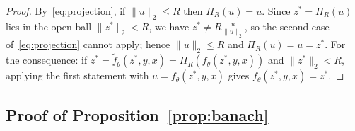 \documentclass{article}
\theoremstyle{plain}
\theoremstyle{definition}
\theoremstyle{remark}
\newcommand{\longonly}[1]{}
\newcommand{\longonly}[1]{#1}
\newcommand{\E}{\mathbb{E}}
\begin{document}
\begin{proof}
By~\eqref{eq:projection}, if $\|u\|_2 \le R$ then $\Pi_R(u)=u$.
Since $z^*=\Pi_R(u)$ lies in the open ball $\|z^*\|_2<R$, we have $z^*\ne R\tfrac{u}{\|u\|_2}$, so the second case of~\eqref{eq:projection} cannot apply; hence $\|u\|_2\le R$ and $\Pi_R(u)=u=z^*$.
For the consequence: if $z^*=\tilde f_\theta(z^*,y,x)=\Pi_R(f_\theta(z^*,y,x))$ and $\|z^*\|_2<R$, applying the first statement with $u=f_\theta(z^*,y,x)$ gives $f_\theta(z^*,y,x)=z^*$.
\end{proof}

\longonly{
\subsection{Proof of Lemma~\ref{lem:Kstep_contraction}}

\begin{proof}
For any $s$:
\begin{align*}
(\mathcal{T}^\pi_K V)(s) &= \E\Bigl[\sum_{k=0}^{K-1}\gamma^k r_k + \gamma^K V(s_K)\Bigr] \\
&= b(s) + \gamma^K (P_\pi^K V)(s),
\end{align*}
where $b(s)$ depends only on rewards and $P_\pi^K$ is the $K$-step transition operator under $\pi$.
Thus:
\[
(\mathcal{T}^\pi_K V)(s) - (\mathcal{T}^\pi_K W)(s) = \gamma^K (P_\pi^K (V-W))(s),
\]
and since $P_\pi^K$ is a Markov operator with $\|P_\pi^K\|_\infty \le 1$:
\[
\|\mathcal{T}^\pi_K V - \mathcal{T}^\pi_K W\|_\infty \le \gamma^K \|V-W\|_\infty.
\]

Since $\gamma^K<1$, the operator $\mathcal{T}^\pi_K$ is a contraction on the Banach space of bounded functions with $\|\cdot\|_\infty$; by Banach's fixed-point theorem it has a unique fixed point.
Since $\mathcal{T}^\pi V^\pi = V^\pi$, iterating gives $\mathcal{T}^\pi_K V^\pi = V^\pi$, so $V^\pi$ is this unique fixed point.


Under our shaping convention, the absorbing self-loop reward is $(\gamma-1)C_{\max}$, hence
$V^\pi(s_{\mathrm{abs}})=-C_{\max}$ for all policies.
Including $s_{\mathrm{abs}}$ in the domain ensures the sup-norm is taken over a well-defined set containing all states reachable during $K$-step rollouts.
By Definition~\ref{def:reachable}, $\mathcal{R}_\pi$ is closed under transitions, so the contraction property holds on this domain.
\end{proof}
}

\subsection{Proof of Proposition~\ref{prop:banach}}
\end{document}
